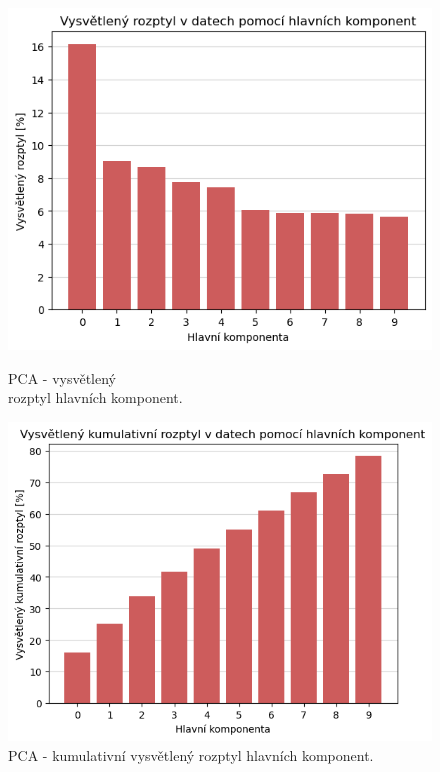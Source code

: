 \begin{figure}[hbtp!]
    \centering
    \begin{minipage}[t]{.466\textwidth}
      \centering
      \captionsetup{justification=centering}

      \includegraphics[width=\textwidth]{obrazky/pripravadat/pca-roztyl_komponetn.png}
      \caption{PCA - vysvětlený \\ rozptyl hlavních komponent.}
      \label{obr:nb:pca_roztyl_komponetn}
    \end{minipage}%
    \begin{minipage}[t]{.5\textwidth}
      \centering
      \captionsetup{justification=centering}

      \includegraphics[width=\textwidth]{obrazky/pripravadat/pca-kum_roztyl_komponetn.png}
      \caption{PCA - kumulativní vysvětlený rozptyl hlavních komponent.}
      \label{obr:nb:pca_kum_roztyl_komponetn}
    \end{minipage}
    \end{figure}

